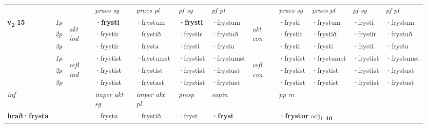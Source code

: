 \begin{longtable}[l]{X>{\footnotesize\itshape}llXXXXlXXXX}
 & &   & \textit{praes sg}  & \textit{praes pl}    & \textit{ pf sg} & \textit{pf pl} & & \textit{praes sg}  & \textit{praes pl}    & \textit{pf sg} & \textit{pf pl }  \\ \cmidrule{4-7} \cmidrule{9-12}
 \multirow{2}{*}{{{\textbf{v{\textsubscript{2}}} \Large{\textbf{15}}}}}  & 1p & \multirow{3}{*}{\begin{turn}{90}\textit{akt ind}\end{turn}} & \textbf{·frysti} & ·frystum & \textbf{·frysti} & ·frystum & \multirow{3}{*}{\begin{turn}{90}\textit{akt con}\end{turn}} &·frysti & ·frystum & ·frysti & ·frystum\\*
 & 2p &  &  ·frystir  & ·frystið & ·frystir & ·frystuð & & ·frystir & ·frystið & ·frystir & ·frystuð \\*
 & 3p &  & ·frystir & ·frysta & ·frysti & ·frystu & & ·frysti & ·frysti& ·frysti & ·frystu \\*
\cmidrule{4-7} \cmidrule{9-12}
 & 1p & \multirow{3}{*}{\begin{turn}{90}\textit{refl ind}\end{turn}}  & ·frystist & ·frystumst & ·frystist & ·frystumst & \multirow{3}{*}{\begin{turn}{90}\textit{refl con}\end{turn}}  &·frystist & ·frystumst & ·frystist & ·frystumst \\*
 & 2p &  & ·frystist & ·frystist & ·frystist & ·frystust & &·frystist & ·frystist & ·frystist & ·frystust \\*
 & 3p  & & ·frystist & ·frystast & ·frystist & ·frystust & & ·frystist & ·frystist& ·frystist & ·frystust \\*
\cmidrule{4-7} \cmidrule{9-12}

   {\textit{inf}} & &  & \textit{imper akt sg} & \textit{imper akt pl}   & \textit{presp} & \textit{supin}  && \textit{pp m} \\*
  {\textbf{hrað\allowbreak ·frysta}} & && ·frystu  & ·frystið   & ·fryst &  \textbf{·fryst}  && \multicolumn{2}{l}{\textbf{·frystur} adj\textbf{\textsubscript{1-10}}} \\*

\midrule


\end{longtable}
